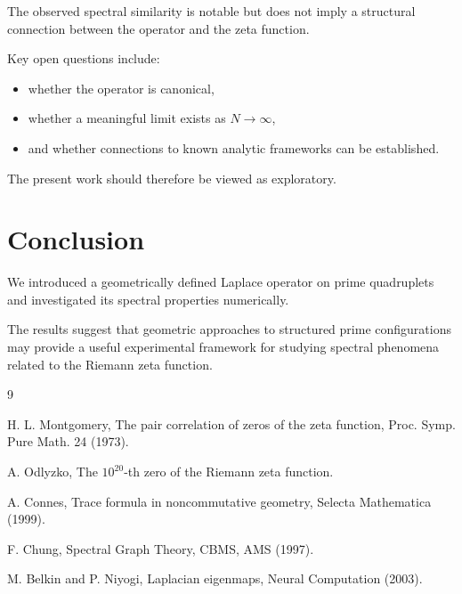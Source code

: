 \documentclass[11pt]{article}
\begin{document}
	The observed spectral similarity is notable but does not imply a structural connection between the operator and the zeta function.
	
	Key open questions include:
	\begin{itemize}
		\item whether the operator is canonical,
		\item whether a meaningful limit exists as $N \to \infty$,
		\item and whether connections to known analytic frameworks can be established.
	\end{itemize}
	
	The present work should therefore be viewed as exploratory.
	
	\section{Conclusion}
	
	We introduced a geometrically defined Laplace operator on prime quadruplets and investigated its spectral properties numerically.
	
	The results suggest that geometric approaches to structured prime configurations may provide a useful experimental framework for studying spectral phenomena related to the Riemann zeta function.
	
	\begin{thebibliography}{9}
		
		H. L. Montgomery,
		The pair correlation of zeros of the zeta function,
		Proc. Symp. Pure Math. 24 (1973).
		
		A. Odlyzko,
		The $10^{20}$-th zero of the Riemann zeta function.
		
		A. Connes,
		Trace formula in noncommutative geometry,
		Selecta Mathematica (1999).
		
		F. Chung,
		Spectral Graph Theory,
		CBMS, AMS (1997).
		
		M. Belkin and P. Niyogi,
		Laplacian eigenmaps,
		Neural Computation (2003).
		
	\end{thebibliography}
	
\end{document}
